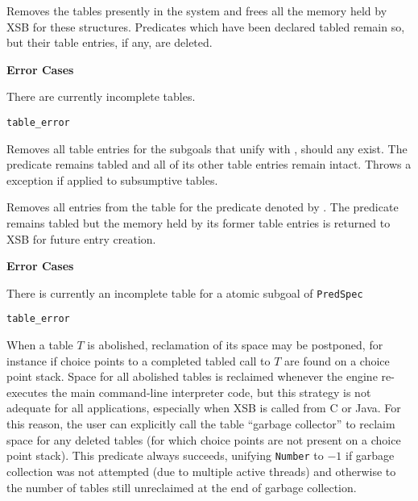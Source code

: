 \begin{description}
\begin{description}
%
Removes the tables presently in the system and frees all the memory
held by XSB for these structures.  Predicates which have been declared
tabled remain so, but their table entries, if any, are deleted.

{\bf Error Cases}
\bi
\item There are currently incomplete tables.
\bi
\item 	{\tt table\_error}
\ei
%
%
\ei




%
Removes all table entries for the subgoals that unify with
, should any exist. The predicate remains tabled and
all of its other table entries remain intact. Throws a
 exception if applied to subsumptive tables.


%
Removes all entries from the table for the predicate denoted by
.  The predicate remains tabled but the memory held by
its former table entries is returned to XSB for future entry creation.

{\bf Error Cases}
\bi
\item There is currently an incomplete table for a atomic subgoal of
  {\tt PredSpec}
\bi
\item 	{\tt table\_error}
\ei
%
%
\ei


%
When a table $T$ is abolished, reclamation of its space may be
postponed, for instance if choice points to a completed tabled call to
$T$ are found on a choice point stack.  Space for all abolished tables
is reclaimed whenever the engine re-executes the main command-line
interpreter code, but this strategy is not adequate for all
applications, especially when XSB is called from C or Java.  For this
reason, the user can explicitly call the table ``garbage collector''
to reclaim space for any deleted tables (for which choice points are
not present on a choice point stack).  This predicate always succeeds,
unifying {\tt Number} to $-1$ if garbage collection was not attempted
(due to multiple active threads) and otherwise to the number of tables
still unreclaimed at the end of garbage collection.


\end{description}
\end{description}
